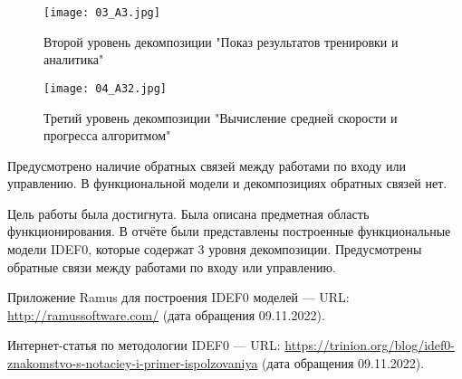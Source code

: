 \documentclass[14pt]{extreport}
\begin{document}
\begin{figure}[H]
\centerline{\texttt{[image: 03\_A3.jpg]}}
\caption{Второй уровень декомпозиции "Показ результатов тренировки и аналитика"}
\label{fig13}
\end{figure}

\begin{figure}[H]
\centerline{\texttt{[image: 04\_A32.jpg]}}
\caption{Третий уровень декомпозиции "Вычисление средней скорости и прогресса алгоритмом"}
\label{fig14}
\end{figure}

Предусмотрено наличие обратных связей между работами по входу или управлению. В функциональной модели и декомпозициях обратных связей нет.

\conclusions

Цель работы была достигнута. Была описана предметная область функционирования. В отчёте были представлены построенные функциональные модели IDEF0, которые содержат 3 уровня декомпозиции. Предусмотрены обратные связи между работами по входу или управлению.

\newpage
\begin{thebibliography}{99}

Приложение Ramus для построения IDEF0 моделей — URL: \url{http://ramussoftware.com/} (дата обращения 09.11.2022).	

Интернет-статья по методологии IDEF0 — URL: \url{https://trinion.org/blog/idef0-znakomstvo-s-notaciey-i-primer-ispolzovaniya} (дата обращения 09.11.2022).	
	
\end{thebibliography}
\end{document}

